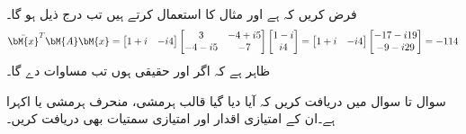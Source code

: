 \quad {}\\
فرض کریں کہ  ہے اور مثال  کا  استعمال کرتے ہیں تب درج ذیل ہو گا۔
\begin{align*}
\bar{\bM{x}}^T\bM{A}\bM{x}=\begin{bmatrix} 1+i&-i4 \end{bmatrix}\begin{bmatrix} 3&-4+i5\\-4-i5&-7 \end{bmatrix}\begin{bmatrix} 
1-i\\i4 \end{bmatrix}=\begin{bmatrix} 1+i&-i4 \end{bmatrix}\begin{bmatrix} -17-i19\\-9-i29 \end{bmatrix}=-114
\end{align*}
ظاہر ہے کہ اگر   اور  حقیقی ہوں تب مساوات   دے گا۔


سوال  تا سوال  میں دریافت کریں کہ آیا دیا گیا قالب ہرمشی، منحرف ہرمشی یا اکہرا ہے۔ان کے امتیازی اقدار اور امتیازی سمتیات بھی دریافت کریں۔ 

